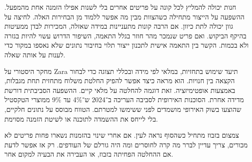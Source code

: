 
{\fontsize{12.3}{17.9}\selectfont

חנות יכולה להמליץ לכל קונה על פריטים אחרים בלי לשנות אפילו הזמנה אחת מהמפעל. ההשפעה על הייצור מתחילה כשהצוות מבין מה אפשר ללמוד מן הבחירות האלה. לחיצה על גוון יכולה לתת כיוון. אם הרבה קונות מתעניינות במידה שאזלה, המכירות לבדן ממעיטות בהיקף הביקוש. ואם פריט שנמכר מהר חוזר בגלל התאמה, השיפור הדרוש עשוי להיות בגזרה ולא בכמות. הקשר בין התאמה אישית לתכנון ייצור תלוי בחיבור נתונים שלא נאספו במקור כדי לענות על אותה שאלה.

מחקר היסטורי על \textenglish{Zara} תיעד שימוש בתחזיות, במלאי לפי מידה ובכללי תצוגה כדי לבחור הקצאה בין חנויות. הוא מראה כיצד אפשר להפיק החלטת משלוח מתחזית תחת מגבלות, באמצעות אופטימיזציה. זאת דוגמה להחלטה על מלאי קיים. ההשפעה הסביבתית דורשת מדידה אחרת. הסוכנות האירופית לסביבה העריכה ב־2024 ש־4\% עד 9\% ממוצרי הטקסטיל שהוצעו בשוק האירופי מושמדים לפני ששימשו למטרתם. הטווח מבוסס על נתונים חלקיים, בלי לייחס את ההשמדה לתוכנה או לשיטת הזמנה מסוימת. 

\par}



\vspace{3mm}


{\fontsize{12.3}{17.9}\selectfont

צמצום בזבוז מתחיל כשהסוף נראה לעין. אם אחרי שינוי בהזמנות נשארו פחות פריטים לא מכורים, צריך עדיין לברר מה קרה לחוסרים ומה היה גורלם של העודפים. רק אז אפשר לדעת אם ההחלטה הפחיתה בזבוז, או העבירה את הבעיה למקום אחר.

\par}
